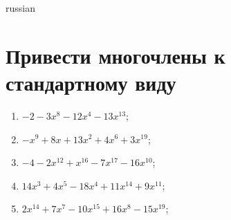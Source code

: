 \documentclass[a4paper]{article}
\begin{document}
\begin{otherlanguage*}{russian}

\section{Привести многочлены к стандартному виду}
\begin{enumerate}
\item $-2 - 3x^8 - 12x^4 - 13x^13$;
\item $-x^9 + 8x + 13x^2 + 4x^6 + 3x^19$;
\item $-4 - 2x^12 + x^16 - 7x^17 - 16x^10$;
\item $14x^3 + 4x^5 - 18x^4 + 11x^14 + 9x^11$;
\item $2x^14 + 7x^7 - 10x^15 + 16x^8 - 15x^19$;
\end{enumerate}
\end{otherlanguage*}
\end{document}
